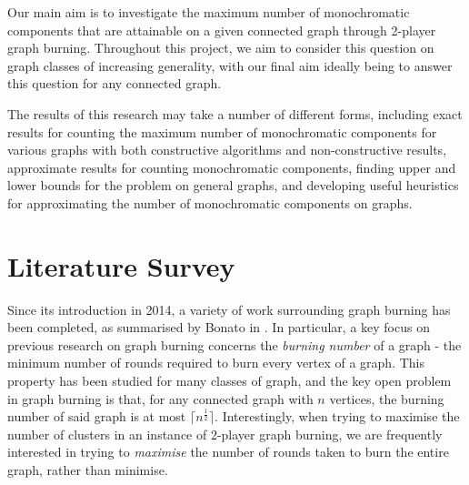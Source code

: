 \documentclass{mprop}
\begin{document}
Our main aim is to investigate the maximum number of monochromatic components that are attainable on a given connected graph through 2-player graph burning. Throughout this project, we aim to consider this question on graph classes of increasing generality, with our final aim ideally being to answer this question for any connected graph.

The results of this research may take a number of different forms, including exact results for counting the maximum number of monochromatic components for various graphs with both constructive algorithms and non-constructive results, approximate results for counting monochromatic components, finding upper and lower bounds for the problem on general graphs, and developing useful heuristics for approximating the number of monochromatic components on graphs.
\section{Literature Survey}

Since its introduction in 2014, a variety of work surrounding graph burning has been completed, as summarised by Bonato in \cite{bonato_survey_2020}. In particular, a key focus on previous research on graph burning concerns the \emph{burning number} of a graph - the minimum number of rounds required to burn every vertex of a graph. This property has been studied for many classes of graph, and the key open problem in graph burning is that, for any connected graph with $n$ vertices, the burning number of said graph is at most $\lceil n^\frac{1}{2} \rceil$. Interestingly, when trying to maximise the number of clusters in an instance of 2-player graph burning, we are frequently interested in trying to \emph{maximise} the number of rounds taken to burn the entire graph, rather than minimise.
\end{document}
